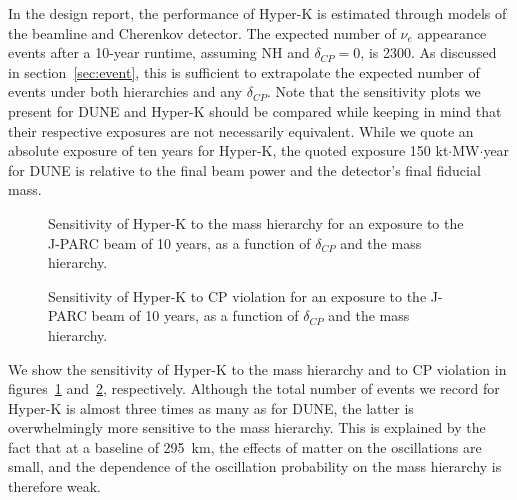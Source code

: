 In the design report, the performance of Hyper-K is estimated through models of
the beamline and Cherenkov detector. The expected number of $\nu_e$ appearance
events after a 10-year runtime, assuming NH and $\delta_{CP}=0$, is 2300.
As discussed in section~\ref{sec:event}, this is sufficient to extrapolate the
expected number of events under both hierarchies and any $\delta_{CP}$.
Note that the sensitivity plots we present for DUNE and Hyper-K should be
compared while keeping in mind that their respective exposures are not
necessarily equivalent. While we quote an absolute exposure of ten years for
Hyper-K, the quoted exposure 150 kt$\cdot$MW$\cdot$year for DUNE is relative to
the final beam power and the detector's final fiducial mass.

\begin{figure}
	\centering
\caption{Sensitivity of Hyper-K to the mass hierarchy for an exposure to the J-PARC
	beam of 10 years, as a function of $\delta_{CP}$ and the mass hierarchy.}
\label{fig:hk_sens_mh}
\end{figure}

\begin{figure}
	\centering
\caption{Sensitivity of Hyper-K to CP violation for an exposure to the J-PARC
	beam of 10 years, as a function of $\delta_{CP}$ and the mass hierarchy.}
\label{fig:hk_sens_cp}
\end{figure}

We show the sensitivity of Hyper-K to the mass hierarchy and to CP violation in
figures~\ref{fig:hk_sens_mh} and~\ref{fig:hk_sens_cp}, respectively.
Although the total number of events we record for Hyper-K is almost three times
as many as for DUNE, the latter is overwhelmingly more sensitive to the mass
hierarchy. This is explained by the fact that at a baseline of \SI{295}{\km},
the effects of matter on the oscillations are small, and the dependence of the
oscillation probability on the mass hierarchy is therefore weak. 

